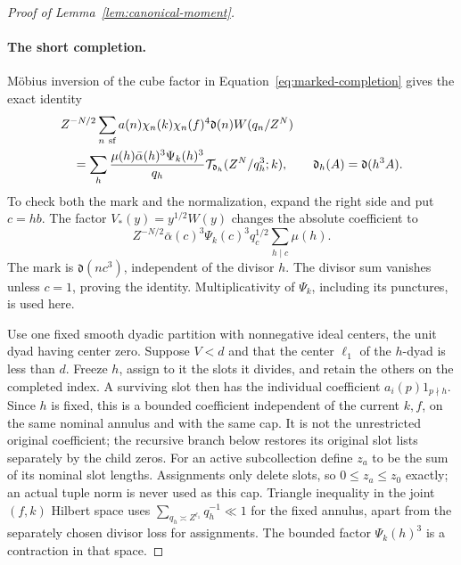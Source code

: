 \documentclass[11pt,a4paper]{article}
\numberwithin{equation}{section}
\numberwithin{figure}{section}
\theoremstyle{definition}
\theoremstyle{remark}
\begin{document}
\begin{proof}[Proof of Lemma~\ref{lem:canonical-moment}]
\paragraph{The short completion.}
M\"obius inversion of the cube factor in
Equation~\eqref{eq:marked-completion} gives the exact identity
\begin{equation}\label{eq:marked-completion-inversion}
 \begin{split}
 &Z^{-N/2}\sum_{n\ {\rm sf}}a(n)\chi_n(k)\chi_n(f)^4
       \mathfrak d(n)W(q_n/Z^N)\\
 &\quad=
 \sum_h\frac{\mu(h)\bar\alpha(h)^3\Psi_k(h)^3}{q_h}
       \mathcal T_{\mathfrak d_h}(Z^N/q_h^3;k),
 \qquad \mathfrak d_h(A)=\mathfrak d(h^3A).
 \end{split}
\end{equation}
To check both the mark and the normalization, expand the right side and
put \(c=hb\).  The factor \(V_*(y)=y^{1/2}W(y)\) changes the absolute
coefficient to
\[
 Z^{-N/2}\bar\alpha(c)^3\Psi_k(c)^3q_c^{1/2}
       \sum_{h\mid c}\mu(h).
\]
The mark is \(\mathfrak d(nc^3)\), independent of the divisor \(h\).
The divisor sum vanishes unless \(c=1\), proving the identity.
Multiplicativity of \(\Psi_k\), including its punctures, is used here.

Use one fixed smooth dyadic partition with nonnegative ideal centers,
the unit dyad having center zero.  Suppose \(V<d\) and that the center
\(\ell_1\) of the \(h\)-dyad is less than \(d\).  Freeze \(h\), assign
to it the slots it divides, and retain the others on the completed
index.  A surviving slot then has the individual coefficient
\(a_i(p)1_{p\nmid h}\).  Since \(h\) is fixed, this is a bounded
coefficient independent of the current \(k,f\), on the same nominal
annulus and with the same cap.  It is not the unrestricted original
coefficient; the recursive branch below restores its original slot
lists separately by the child zeros.  For an active subcollection define \(z_a\) to be the sum of its
nominal slot lengths.  Assignments only delete slots, so
\(0\le z_a\le z_0\) exactly; an actual tuple norm is never used as this
cap.  Triangle inequality in the joint \((f,k)\) Hilbert space uses
\(\sum_{q_h\asymp Z^{\ell_1}}q_h^{-1}\ll1\) for the fixed annulus,
apart from the separately chosen divisor loss for assignments.  The
bounded factor \(\Psi_k(h)^3\) is a contraction in that space.


\end{proof}
\end{document}
